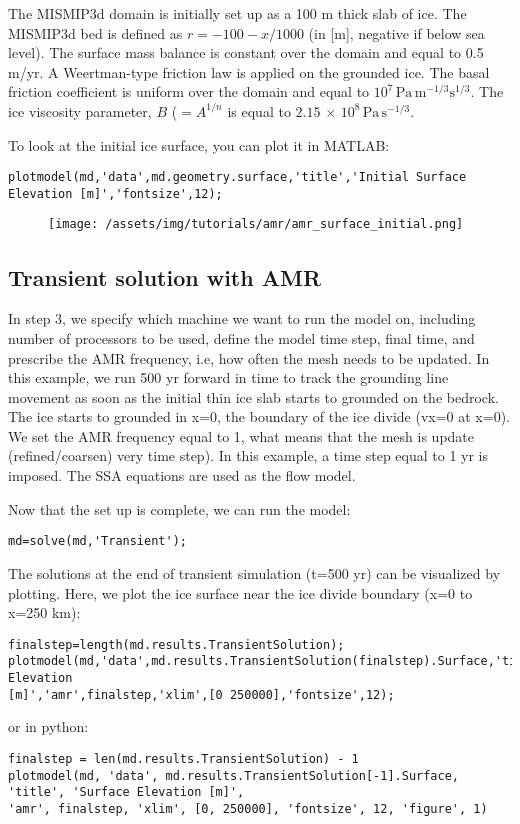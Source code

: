 The MISMIP3d domain is initially set up as a 100 m thick slab of ice. The MISMIP3d bed is defined as $r=-100-x/1000$ (in [m], negative if below sea level). The surface mass balance is constant over the domain and equal to 0.5 m/yr. A Weertman-type friction law is applied on the grounded ice. The basal friction coefficient is uniform over the domain and equal to $10^{7}\,\textrm{Pa}\,\textrm{m}^{-1/3}\textrm{s}^{1/3}$. The ice viscosity parameter, $B$ ($=A^{1/n}$ is equal to $2.15 \, \times \, 10^{8}\,\textrm{Pa}\,\textrm{s}^{-1/3}$.

To look at the initial ice surface, you can plot it in MATLAB:
\begin{verbatim}plotmodel(md,'data',md.geometry.surface,'title','Initial Surface Elevation [m]','fontsize',12);\end{verbatim}

\begin{figure}[H]
	\begin{center}
		\texttt{[image: /assets/img/tutorials/amr/amr\_surface\_initial.png]}
	\end{center}
\end{figure}

\subsection{Transient solution with AMR}
In step 3, we specify which machine we want to run the model on, including number of processors to be used, define the model time step, final time, and prescribe the AMR frequency, i.e, how often the mesh needs to be updated. In this example, we run 500 yr forward in time to track the grounding line movement as soon as the initial thin ice slab starts to grounded on the bedrock. The ice starts to grounded in x=0, the boundary of the ice divide (vx=0 at x=0). We set the AMR frequency equal to 1, what means that the mesh is update (refined/coarsen) very time step). In this example, a time step equal to 1 yr is imposed. The SSA equations are used as the flow model.

Now that the set up is complete, we can run the model:
\begin{verbatim}md=solve(md,'Transient');\end{verbatim}

The solutions at the end of transient simulation (t=500 yr) can be visualized by plotting. Here, we plot the ice surface near the ice divide boundary (x=0 to x=250 km):
\begin{verbatim}finalstep=length(md.results.TransientSolution);
plotmodel(md,'data',md.results.TransientSolution(finalstep).Surface,'title','Surface Elevation
[m]','amr',finalstep,'xlim',[0 250000],'fontsize',12);\end{verbatim}
or in python:
\begin{verbatim}finalstep = len(md.results.TransientSolution) - 1
plotmodel(md, 'data', md.results.TransientSolution[-1].Surface, 'title', 'Surface Elevation [m]',
'amr', finalstep, 'xlim', [0, 250000], 'fontsize', 12, 'figure', 1)\end{verbatim}

